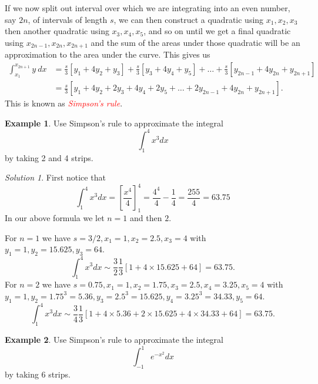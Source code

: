 \documentclass[
  11pt,
  oneside]{book}
\newcommand{\slide}{}
\theoremstyle{definition}
\theoremstyle{definition}
\newtheorem{example}{Example}[chapter]
\theoremstyle{definition}
\theoremstyle{definition}
\theoremstyle{remark}
\newtheorem*{solution}{Solution}
\begin{document}
If we now split out interval over which we are integrating into an even number, say \(2n\), of intervals of length \(s\), we can then construct a quadratic using \(x_1, x_2, x_3\) then another quadratic using \(x_3, x_4, x_5\), and so on until we get a final quadratic using \(x_{2n-1},x_{2n},x_{2n+1}\) and the sum of the areas under those quadratic will be an approximation to the area under the curve. This gives us
\begin{align*}
\int_{x_1}^{x_{2n+1}}y\ dx& = \frac s3\left[y_1+4y_2+y_3\right] + \frac s3\left[y_3+4y_4+y_5\right] + \ldots + \frac s3\left[y_{2n-1}+4y_{2n}+y_{2n+1}\right]\\
&=\frac s3\left[y_1+4y_2+2y_3+4y_4+2y_5+\ldots +2y_{2n-1}+4y_{2n}+y_{2n+1}\right].
\end{align*}
This is known as \textcolor{red}{\em Simpson's rule}.
\slide

\begin{example}
Use Simpson's rule to approximate the integral
\[
\int_1^4x^3dx
\]
by taking 2 and 4 strips.
\end{example}

\begin{solution}
First notice that
\[
\int_1^4x^3dx = \left[\frac{x^4}4\right]_1^4 = \frac{4^4}4-\frac14 = \frac{255}4=63.75
\]
In our above formula we let \(n=1\) and then \(2\).

For \(n=1\) we have \(s=3/2, x_1=1, x_2=2.5, x_3=4\) with \(y_1=1, y_2=15.625, y_3=64\).
\[
\int_1^4x^3dx\sim\frac32\frac13\left[1+4\times15.625+64\right] = 63.75.
\]
For \(n=2\) we have \(s=0.75, x_1=1, x_2=1.75, x_3=2.5, x_4=3.25, x_5=4\) with \(y_1=1, y_2=1.75^3=5.36, y_3 = 2.5^3=15.625, y_4=3.25^3=34.33, y_5=64\).
\[
\int_1^4x^3dx\sim\frac34\frac13\left[1+4\times5.36+2\times15.625+4\times34.33+64\right] = 63.75.
\]
\end{solution}

\slide

\begin{example}
Use Simpson's rule to approximate the integral
\[
\int_{-1}^1e^{-x^2}dx
\]
by taking 6 strips.
\end{example}
\end{document}
